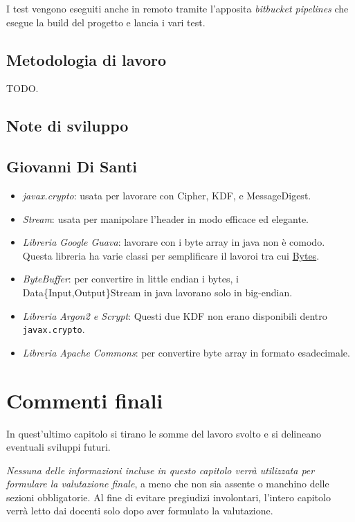 \documentclass[a4paper,12pt]{report}
\begin{document}
I test vengono eseguiti anche in remoto tramite l'apposita \textit{bitbucket pipelines} che
esegue la build del progetto e lancia i vari test.

\section{Metodologia di lavoro}

TODO.

\section{Note di sviluppo}

\section*{Giovanni Di Santi}

\begin{itemize}
  \item \textit{javax.crypto}: usata per lavorare con Cipher, KDF, e MessageDigest.
  \item \textit{Stream}: usata per manipolare l'header in modo efficace ed elegante.
  \item \textit{Libreria Google Guava}: lavorare con i byte array in java non è comodo. Questa libreria ha varie classi per semplificare
    il lavoroi tra cui \href{https://guava.dev/releases/19.0/api/docs/com/google/common/primitives/Bytes.html}{Bytes}.
  \item \textit{ByteBuffer}: per convertire in little endian i bytes, i Data\{Input,Output\}Stream in java lavorano solo in big-endian.
  \item \textit{Libreria Argon2 e Scrypt}: Questi due KDF non erano disponibili dentro \texttt{javax.crypto}.
  \item \textit{Libreria Apache Commons}: per convertire byte array in formato esadecimale.
\end{itemize}

\chapter{Commenti finali}

In quest'ultimo capitolo si tirano le somme del lavoro svolto e si delineano eventuali sviluppi 
futuri.

\textit{Nessuna delle informazioni incluse in questo capitolo verrà utilizzata per formulare la valutazione finale}, a meno che non sia assente o manchino delle sezioni obbligatorie.
%
Al fine di evitare pregiudizi involontari, l'intero capitolo verrà letto dai docenti solo dopo aver formulato la valutazione.
\end{document}
